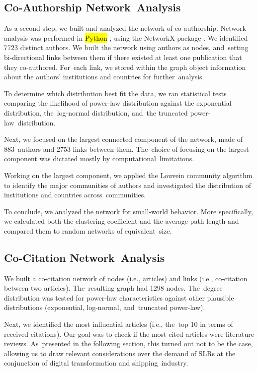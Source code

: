 \documentclass[jmse,review,accept,pdftex,moreauthors]{Definitions/mdpi}
\begin{document}
\subsection{Co-Authorship Network~Analysis}
As a second step, we built and analyzed the network of co-authorship. Network analysis was performed in \hl{Python}%
, using the NetworkX package \citep{hagberg2008exploring}. We identified 7723 distinct authors. We built the network using authors as nodes, and~setting bi-directional links between them if there existed at least one publication that they co-authored. For~each link, we stored within the graph object information about the authors' institutions and countries for further~analysis.

To determine which distribution best fit the data, we ran statistical tests comparing the likelihood of power-law distribution against the exponential distribution, the~log-normal distribution, and~the truncated power-law~distribution.

Next, we focused on the largest connected component of the network, made of 883~authors and 2753 links between them. The~choice of focusing on the largest component was dictated mostly by computational~limitations.

Working on the largest component, we applied the Louvein community \citep{blondel2008fast} algorithm to identify the major communities of authors and investigated the distribution of institutions and countries across~communities.

To conclude, we analyzed the network for small-world behavior. More specifically, we calculated both the clustering coefficient and the average path length and compared them to random networks of equivalent~size.

\subsection{Co-Citation Network~Analysis}
We built a co-citation network of nodes (i.e., articles) and links (i.e., co-citation between two articles). The~resulting graph had 1298 nodes. The~degree distribution was tested for power-law characteristics against other plausible distributions (exponential, log-normal, and~truncated power-law).

Next, we identified the most influential articles (i.e., the~top 10 in terms of received citations). Our goal was to check if the most cited articles were literature reviews. As~presented in the following section, this turned out not to be the case, allowing us to draw relevant considerations over the demand of SLRs at the conjunction of digital transformation and shipping~industry.
\end{document}
